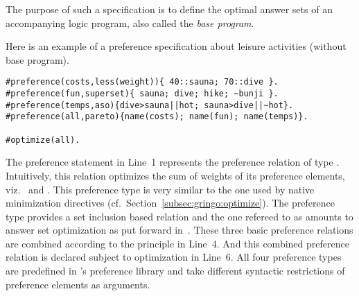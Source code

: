 The purpose of such a specification is to define the optimal answer sets of an accompanying logic program,
also called the \emph{base program}.

Here is an example of a {preference specification} about leisure activities (without base program).
\begin{lstlisting}[escapechar=?]
#preference(costs,less(weight)){ 40::sauna; 70::dive }.
#preference(fun,superset){ sauna; dive; hike; ~bunji }.
#preference(temps,aso){dive>sauna||hot; sauna>dive||~hot}.
#preference(all,pareto){name(costs); name(fun); name(temps)}.

#optimize(all).
\end{lstlisting}
The preference statement in Line~1 represents the preference relation  of type .
Intuitively, this relation optimizes the sum of weights of its preference elements, 
viz.\  and .
This preference type is very similar to the one used by native minimization directives (cf.\ Section~\ref{subsec:gringo:optimize}).
The preference type  provides a set inclusion based relation and the one refereed to as 
amounts to answer set optimization as put forward in~\cite{brnitr03a}.
These three basic preference relations are combined according to the  principle in Line~4.
And this combined preference relation is declared subject to optimization in Line~6.
%
All four preference types are predefined in \asprin's preference library and take different syntactic restrictions of preference elements as arguments.
